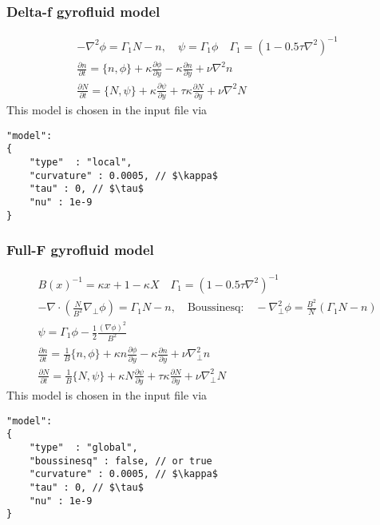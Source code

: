 \subsubsection{Delta-f gyrofluid model}
\begin{subequations}
\begin{align}
 -\nabla^2 \phi =  \Gamma_1 N -n, \quad
\psi = \Gamma_1 \phi \quad \Gamma_1 = ( 1- 0.5\tau\nabla^2)^{-1} \\
 \frac{\partial n}{\partial t}     =
    \{ n, \phi\}
  + \kappa \frac{\partial \phi}{\partial y}
  -\kappa \frac{\partial n}{\partial y}
  + \nu \nabla^2 n  \\
  \frac{\partial N}{\partial t} =
  \{ N, \psi\}
  + \kappa \frac{\partial \psi}{\partial y}
  + \tau \kappa\frac{\partial N}{\partial y} +\nu\nabla^2N
\end{align}
\end{subequations}
This model is chosen in the input file via
\begin{verbatim}
"model":
{
    "type"  : "local",
    "curvature" : 0.0005, // $\kappa$
    "tau" : 0, // $\tau$
    "nu" : 1e-9
}
\end{verbatim}

\subsubsection{Full-F gyrofluid model}
\begin{subequations}
\begin{align}
B(x)^{-1} = \kappa x +1-\kappa X\quad \Gamma_1 = ( 1- 0.5\tau\nabla^2)^{-1}\\
 -\nabla\cdot \left(\frac{N}{B^2} \nabla_\perp \phi\right) = \Gamma_1 N-n, \quad
 \text{Boussinesq:}\quad -\nabla_\perp^2 \phi = \frac{B^2}{N} (\Gamma_1 N -n) \\
\psi = \Gamma_1 \phi - \frac{1}{2} \frac{(\nabla\phi)^2}{B^2}\\
 \frac{\partial n}{\partial t}     =
    \frac{1}{B}\{ n, \phi\}
  + \kappa n\frac{\partial \phi}{\partial y}
  -\kappa \frac{\partial n}{\partial y}
  + \nu \nabla_\perp^2 n  \\
  \frac{\partial N}{\partial t} =
  \frac{1}{B}\{ N, \psi\}
  + \kappa N\frac{\partial \psi}{\partial y}
  + \tau \kappa\frac{\partial N}{\partial y} +\nu\nabla_\perp^2N
\end{align}
\end{subequations}
This model is chosen in the input file via
\begin{verbatim}
"model":
{
    "type"  : "global",
    "boussinesq" : false, // or true
    "curvature" : 0.0005, // $\kappa$
    "tau" : 0, // $\tau$
    "nu" : 1e-9
}
\end{verbatim}

